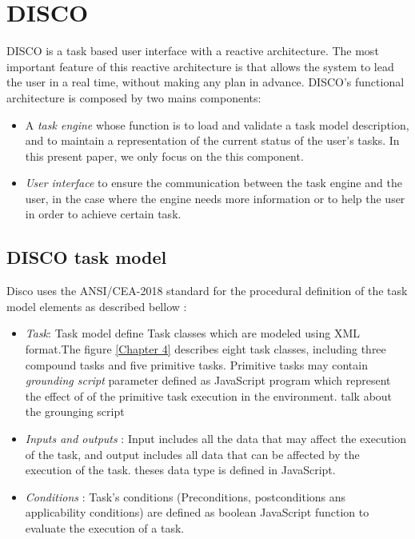 \section{DISCO}
DISCO \cite{rich2009building}is a task based user interface with a reactive architecture. The  most important feature of this reactive architecture is that allows the system to lead the user in a real time, without making any plan in advance. DISCO's functional architecture is composed by two mains components:
 \begin{itemize}
 	\item A \textit{task engine} whose function is to load and validate a task model description, and to maintain a representation	of the current status of the user’s tasks.\cite{rich2009building} In this present paper, we only focus on the this component. 
 	\item \textit{User interface} to ensure the communication between the task engine and the user, in the case where the engine needs more information or to help the user in order to achieve certain task.
 	

 \end{itemize}
\subsection{DISCO task model}
Disco uses the ANSI/CEA-2018 standard for the procedural definition of the task model elements as described bellow :
 \begin{itemize}
\item \textit{Task}: Task model define Task classes which are modeled using XML format.The figure \ref{Chapter 4} describes eight task classes, including three compound tasks and  five primitive tasks. Primitive tasks may contain \textit{grounding script} parameter defined as JavaScript program which represent the effect of of the primitive task execution in the environment.
talk about the grounging script
\item \textit{Inputs and outputs} : Input includes all the data that may affect the execution of the task, and output includes all data that can be affected by the execution of the task. theses data type is defined in JavaScript.
\item \textit{Conditions} : Task's conditions (Preconditions, postconditions ans applicability conditions) are defined as boolean JavaScript function to evaluate the execution of a task.
	
 \end{itemize}	



